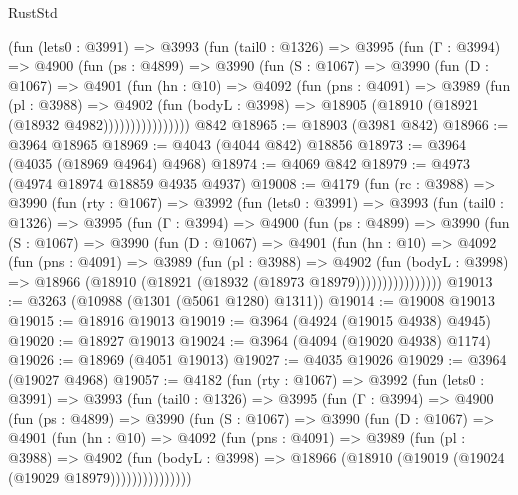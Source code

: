 \begin{lexlean}{RustStd}
\begin{coremodule}
{\begin{coremodule}
{{{{{{{{{{{{{{{{{{{{{{{{{{{{{{{{{{{{{{          (fun (lets0 : @3991) =>
          @3993
            (fun (tail0 : @1326) =>
            @3995
              (fun (Γ : @3994) =>
              @4900
                (fun (ps : @4899) =>
                @3990
                  (fun (S : @1067) =>
                  @3990
                    (fun (D : @1067) =>
                    @4901
                      (fun (hn : @10) =>
                      @4092
                        (fun (pns : @4091) =>
                        @3989
                          (fun (pl : @3988) =>
                          @4902
                            (fun (bodyL : @3998) =>
                            @18905 (@18910 (@18921 (@18932 @4982))))))))))))))))
    @842
@18965 := @18903 (@3981 @842)
@18966 := @3964 @18965
@18969 := @4043 (@4044 @842) @18856
@18973 := @3964 (@4035 (@18969 @4964) @4968)
@18974 := @4069 @842
@18979 := @4973 (@4974 @18974 @18859 @4935 @4937)
@19008 := @4179
    (fun (rc : @3988) =>
    @3990
      (fun (rty : @1067) =>
      @3992
        (fun (lets0 : @3991) =>
        @3993
          (fun (tail0 : @1326) =>
          @3995
            (fun (Γ : @3994) =>
            @4900
              (fun (ps : @4899) =>
              @3990
                (fun (S : @1067) =>
                @3990
                  (fun (D : @1067) =>
                  @4901
                    (fun (hn : @10) =>
                    @4092
                      (fun (pns : @4091) =>
                      @3989
                        (fun (pl : @3988) =>
                        @4902
                          (fun (bodyL : @3998) =>
                          @18966 (@18910 (@18921 (@18932 (@18973 @18979))))))))))))))))
@19013 := @3263 (@10988 (@1301 (@5061 @1280) @1311))
@19014 := @19008 @19013
@19015 := @18916 @19013
@19019 := @3964 (@4924 (@19015 @4938) @4945)
@19020 := @18927 @19013
@19024 := @3964 (@4094 (@19020 @4938) @1174)
@19026 := @18969 (@4051 @19013)
@19027 := @4035 @19026
@19029 := @3964 (@19027 @4968)
@19057 := @4182
    (fun (rty : @1067) =>
    @3992
      (fun (lets0 : @3991) =>
      @3993
        (fun (tail0 : @1326) =>
        @3995
          (fun (Γ : @3994) =>
          @4900
            (fun (ps : @4899) =>
            @3990
              (fun (S : @1067) =>
              @3990
                (fun (D : @1067) =>
                @4901
                  (fun (hn : @10) =>
                  @4092
                    (fun (pns : @4091) =>
                    @3989
                      (fun (pl : @3988) =>
                      @4902
                        (fun (bodyL : @3998) =>
                        @18966 (@18910 (@19019 (@19024 (@19029 @18979)))))))))))))))
}}}}}}}}}}}}}}}}}}}}}}}}}}}}}}}}}}}}}}
\end{coremodule}}
\end{coremodule}
\end{lexlean}
